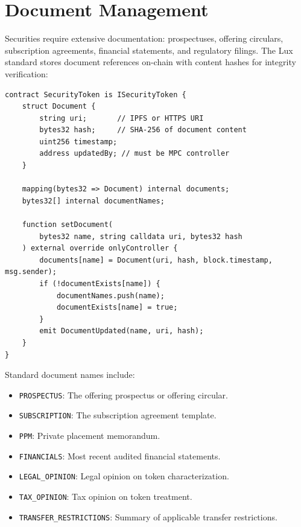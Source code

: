 \section{Document Management}
\label{sec:documents}

Securities require extensive documentation: prospectuses, offering circulars, subscription agreements, financial statements, and regulatory filings. The Lux standard stores document references on-chain with content hashes for integrity verification:

\begin{lstlisting}[language=Solidity,caption={Document management.}]
contract SecurityToken is ISecurityToken {
    struct Document {
        string uri;       // IPFS or HTTPS URI
        bytes32 hash;     // SHA-256 of document content
        uint256 timestamp;
        address updatedBy; // must be MPC controller
    }

    mapping(bytes32 => Document) internal documents;
    bytes32[] internal documentNames;

    function setDocument(
        bytes32 name, string calldata uri, bytes32 hash
    ) external override onlyController {
        documents[name] = Document(uri, hash, block.timestamp, msg.sender);
        if (!documentExists[name]) {
            documentNames.push(name);
            documentExists[name] = true;
        }
        emit DocumentUpdated(name, uri, hash);
    }
}
\end{lstlisting}

Standard document names include:

\begin{itemize}[nosep]
  \item \texttt{PROSPECTUS}: The offering prospectus or offering circular.
  \item \texttt{SUBSCRIPTION}: The subscription agreement template.
  \item \texttt{PPM}: Private placement memorandum.
  \item \texttt{FINANCIALS}: Most recent audited financial statements.
  \item \texttt{LEGAL\_OPINION}: Legal opinion on token characterization.
  \item \texttt{TAX\_OPINION}: Tax opinion on token treatment.
  \item \texttt{TRANSFER\_RESTRICTIONS}: Summary of applicable transfer restrictions.
\end{itemize}

